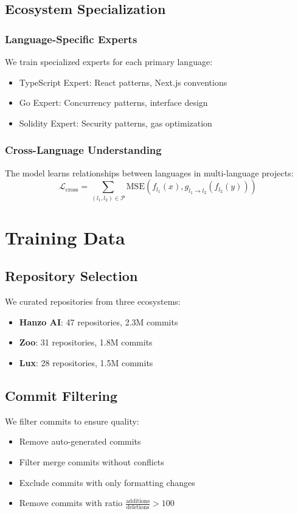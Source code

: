 \documentclass[11pt,a4paper]{article}
\begin{document}
\subsection{Ecosystem Specialization}

\subsubsection{Language-Specific Experts}
We train specialized experts for each primary language:
\begin{itemize}
    \item TypeScript Expert: React patterns, Next.js conventions
    \item Go Expert: Concurrency patterns, interface design
    \item Solidity Expert: Security patterns, gas optimization
\end{itemize}

\subsubsection{Cross-Language Understanding}
The model learns relationships between languages in multi-language projects:
\begin{equation}
    \mathcal{L}_{\text{cross}} = \sum_{(l_1, l_2) \in \mathcal{P}} \text{MSE}(f_{l_1}(x), g_{l_1 \rightarrow l_2}(f_{l_2}(y)))
\end{equation}

\section{Training Data}

\subsection{Repository Selection}
We curated repositories from three ecosystems:
\begin{itemize}
    \item \textbf{Hanzo AI}: 47 repositories, 2.3M commits
    \item \textbf{Zoo}: 31 repositories, 1.8M commits
    \item \textbf{Lux}: 28 repositories, 1.5M commits
\end{itemize}

\subsection{Commit Filtering}
We filter commits to ensure quality:
\begin{itemize}
    \item Remove auto-generated commits
    \item Filter merge commits without conflicts
    \item Exclude commits with only formatting changes
    \item Remove commits with ratio $\frac{\text{additions}}{\text{deletions}} > 100$
\end{itemize}
\end{document}
